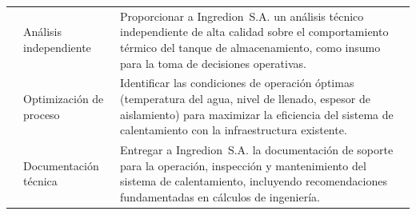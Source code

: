 \begin{table}[H]
\begin{tabularx}{\textwidth}{@{}NlX@{}}
		\cmidrule(lr){1-3}
		& An\'alisis independiente & Proporcionar a Ingredion~S.A. un an\'alisis t\'ecnico independiente de alta calidad sobre el comportamiento t\'ermico del tanque de almacenamiento, como insumo para la toma de decisiones operativas. \\
		& Optimizaci\'on de proceso & Identificar las condiciones de operaci\'on \'optimas (temperatura del agua, nivel de llenado, espesor de aislamiento) para maximizar la eficiencia del sistema de calentamiento con la infraestructura existente. \\
		& Documentaci\'on t\'ecnica & Entregar a Ingredion~S.A. la documentaci\'on de soporte para la operaci\'on, inspecci\'on y mantenimiento del sistema de calentamiento, incluyendo recomendaciones fundamentadas en c\'alculos de ingenier\'ia. \\
		\bottomrule
	\end{tabularx}
\end{table}
